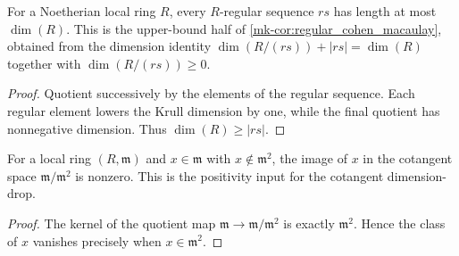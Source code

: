 \begin{lemma}\label{mk-lem:length_le_ringKrullDim_of_isRegular}
  \leanok

  For a Noetherian local ring \(R\), every \(R\)-regular sequence \(rs\) has length at
  most \(\dim(R)\). This is the upper-bound half of \ref{mk-cor:regular_cohen_macaulay},
  obtained from the dimension identity \(\dim(R / (rs)) + |rs| = \dim(R)\) together with
  \(\dim(R / (rs)) \geq 0\).
\end{lemma}
\begin{proof}
  \leanok

Quotient successively by the elements of the regular sequence.
  Each regular element lowers the Krull dimension by one, while the final
  quotient has nonnegative dimension. Thus
  \(\dim(R)\geq |rs|\).
\end{proof}

\begin{lemma}\label{mk-lem:toCotangent_ne_zero_of_not_mem_sq}
  \leanok

  For a local ring \((R, \mathfrak m)\) and \(x \in \mathfrak m\) with \(x \notin \mathfrak m^2\),
  the image of \(x\) in the cotangent space \(\mathfrak m / \mathfrak m^2\) is nonzero. This is
  the positivity input for the cotangent dimension-drop.
\end{lemma}
\begin{proof}
  \leanok

The kernel of the quotient map
  \(\mathfrak m\to\mathfrak m/\mathfrak m^2\) is exactly
  \(\mathfrak m^2\). Hence the class of \(x\) vanishes precisely when
  \(x\in\mathfrak m^2\).
\end{proof}

